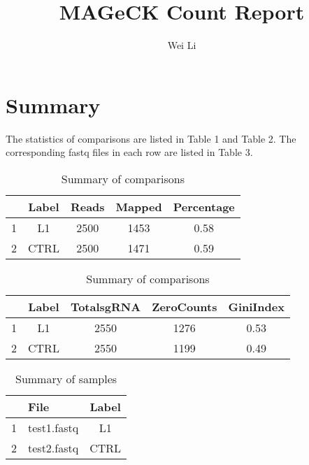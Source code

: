 \documentclass{article}
\begin{document}

\title{MAGeCK Count Report}
\author{Wei Li}

\maketitle


\tableofcontents

\section{Summary}



The statistics of comparisons are listed in Table 1 and Table 2.
The corresponding fastq files in each row are listed in Table 3.

\begin{table}[ht]
\centering
\begin{tabular}{ccccc}
  \hline
 & Label & Reads & Mapped & Percentage \\ 
  \hline
1 & L1 & 2500 & 1453 & 0.58 \\ 
  2 & CTRL & 2500 & 1471 & 0.59 \\ 
   \hline
\end{tabular}
\caption{Summary of comparisons} 
\label{tab:one}
\end{table}
\begin{table}[ht]
\centering
\begin{tabular}{ccccc}
  \hline
 & Label & TotalsgRNA & ZeroCounts & GiniIndex \\ 
  \hline
1 & L1 & 2550 & 1276 & 0.53 \\ 
  2 & CTRL & 2550 & 1199 & 0.49 \\ 
   \hline
\end{tabular}
\caption{Summary of comparisons} 
\label{tab:two}
\end{table}




\begin{table}[ht]
\centering
\begin{tabular}{cp{9cm}c}
  \hline
 & File & Label \\ 
  \hline
1 & test1.fastq & L1 \\ 
  2 & test2.fastq & CTRL \\ 
   \hline
\end{tabular}
\caption{Summary of samples} 
\label{tab:three}
\end{table}
\end{document}
